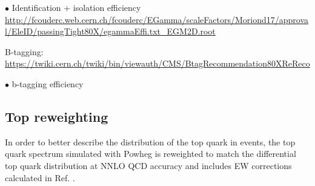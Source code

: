 $\bullet$ Identification + isolation efficiency
{\small\url{http://fcouderc.web.cern.ch/fcouderc/EGamma/scaleFactors/Moriond17/approval/EleID/passingTight80X/egammaEffi.txt\_EGM2D.root}}
\medskip

B-tagging: {\small\url{https://twiki.cern.ch/twiki/bin/viewauth/CMS/BtagRecommendation80XReReco}}

$\bullet$ b-tagging efficiency

\subsection{Top \pt reweighting}
In order to better describe the \pt distribution of the top quark in \ttbar events, the top quark \pt spectrum simulated with {\sc Powheg} is reweighted to match the differential top quark \pt distribution at NNLO QCD accuracy and includes EW corrections calculated in Ref. \cite{Czakon:2017wor}.
